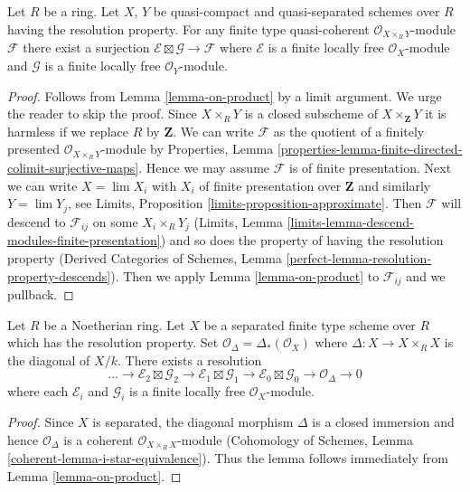 \begin{lemma}
\label{lemma-on-product-general}
Let $R$ be a ring. Let $X$, $Y$ be quasi-compact and quasi-separated
schemes over $R$ having the resolution property. For any finite
type quasi-coherent $\mathcal{O}_{X \times_R Y}$-module $\mathcal{F}$
there exist a surjection $\mathcal{E} \boxtimes \mathcal{G} \to \mathcal{F}$
where $\mathcal{E}$ is a finite locally free $\mathcal{O}_X$-module
and $\mathcal{G}$ is a finite locally free $\mathcal{O}_Y$-module.
\end{lemma}

\begin{proof}
Follows from Lemma \ref{lemma-on-product} by a limit argument.
We urge the reader to skip the proof.
Since $X \times_R Y$ is a closed subscheme of $X \times_\mathbf{Z} Y$
it is harmless if we replace $R$ by $\mathbf{Z}$.
We can write $\mathcal{F}$ as the quotient of
a finitely presented $\mathcal{O}_{X \times_R Y}$-module by
Properties, Lemma
\ref{properties-lemma-finite-directed-colimit-surjective-maps}.
Hence we may assume $\mathcal{F}$ is of
finite presentation. Next we can write $X = \lim X_i$
with $X_i$ of finite presentation over $\mathbf{Z}$ and similarly
$Y = \lim Y_j$, see Limits, Proposition \ref{limits-proposition-approximate}.
Then $\mathcal{F}$ will descend to $\mathcal{F}_{ij}$ on some $X_i \times_R Y_j$
(Limits, Lemma \ref{limits-lemma-descend-modules-finite-presentation}) and
so does the property of having the resolution property
(Derived Categories of Schemes, Lemma
\ref{perfect-lemma-resolution-property-descends}).
Then we apply Lemma \ref{lemma-on-product}
to $\mathcal{F}_{ij}$ and we pullback.
\end{proof}

\begin{lemma}
\label{lemma-diagonal-resolution}
Let $R$ be a Noetherian ring. Let $X$ be a separated finite type scheme
over $R$ which has the resolution property. Set
$\mathcal{O}_\Delta = \Delta_*(\mathcal{O}_X)$ where
$\Delta : X \to X \times_R X$ is the diagonal of $X/k$.
There exists a resolution
$$
\ldots \to
\mathcal{E}_2 \boxtimes \mathcal{G}_2 \to
\mathcal{E}_1 \boxtimes \mathcal{G}_1 \to
\mathcal{E}_0 \boxtimes \mathcal{G}_0 \to
\mathcal{O}_\Delta \to 0
$$
where each $\mathcal{E}_i$ and $\mathcal{G}_i$ is a finite locally
free $\mathcal{O}_X$-module.
\end{lemma}

\begin{proof}
Since $X$ is separated, the diagonal morphism $\Delta$ is a closed
immersion and hence $\mathcal{O}_\Delta$ is a coherent
$\mathcal{O}_{X \times_R X}$-module (Cohomology of Schemes, Lemma
\ref{coherent-lemma-i-star-equivalence}).
Thus the lemma follows immediately from Lemma \ref{lemma-on-product}.
\end{proof}

